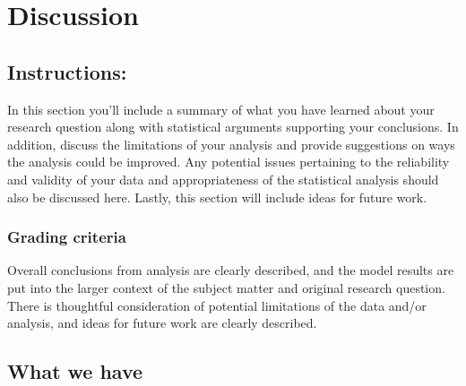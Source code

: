 \documentclass[
  letterpaper,
  DIV=11,
  numbers=noendperiod]{scrartcl}
\begin{document}
\hypertarget{discussion}{%
\section{Discussion}\label{discussion}}

\hypertarget{instructions-3}{%
\subsection{Instructions:}\label{instructions-3}}

In this section you'll include a summary of what you have learned about
your research question along with statistical arguments supporting your
conclusions. In addition, discuss the limitations of your analysis and
provide suggestions on ways the analysis could be improved. Any
potential issues pertaining to the reliability and validity of your data
and appropriateness of the statistical analysis should also be discussed
here. Lastly, this section will include ideas for future work.

\hypertarget{grading-criteria-3}{%
\subsubsection{Grading criteria}\label{grading-criteria-3}}

Overall conclusions from analysis are clearly described, and the model
results are put into the larger context of the subject matter and
original research question. There is thoughtful consideration of
potential limitations of the data and/or analysis, and ideas for future
work are clearly described.

\hypertarget{what-we-have-3}{%
\subsection{What we have}\label{what-we-have-3}}
\end{document}
